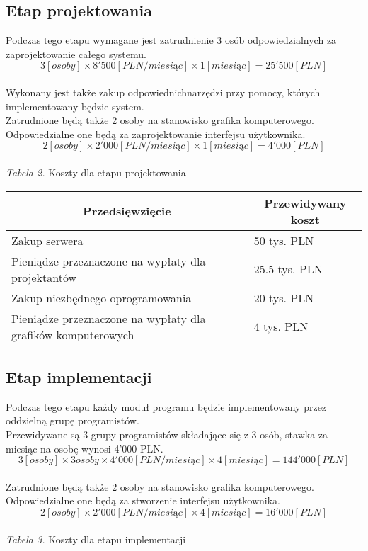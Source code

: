 \documentclass [11pt, a4paper, leqno]	{article}	%
\begin{document}
\subsection{Etap projektowania}
\noindent
Podczas tego etapu wymagane jest zatrudnienie 3 osób odpowiedzialnych za zaprojektowanie całego systemu. \\
\begin{equation}3 [osoby] \times  8'500 [PLN/miesiąc] \times 1 [miesiąc] = 25'500 [PLN] \end{equation} \\
Wykonany jest także zakup odpowiednichnarzędzi przy pomocy, których implementowany będzie system.  \\
Zatrudnione będą także 2 osoby na stanowisko grafika komputerowego. Odpowiedzialne one będą za zaprojektowanie interfejsu użytkownika. \\
\begin{equation}2 [osoby] \times 2'000 [PLN/miesiąc] \times 1 [miesiąc] = 4'000 [PLN] \end{equation} \\
\textit{Tabela 2.} Koszty dla etapu projektowania

\begin{center}
	\begin{tabular}{| l | l |}
		\hline
		\multicolumn{1}{|c|}{Przedsięwzięcie} & 
		\multicolumn{1}{|c|}{Przewidywany koszt} \\ \hline \hline
		Zakup serwera & 50 tys. PLN \\ \hline
		Pieniądze przeznaczone na wypłaty dla projektantów & 25.5 tys. PLN \\ \hline
		Zakup niezbędnego oprogramowania & 20 tys. PLN \\ \hline
		Pieniądze przeznaczone na wypłaty dla grafików komputerowych & 4 tys. PLN \\ \hline
	\end{tabular}
\end{center}

\subsection{Etap implementacji}
\noindent
Podczas tego etapu każdy moduł programu będzie implementowany przez oddzielną grupę programistów. \\
Przewidywane są 3 grupy programistów składające się z 3 osób, stawka za miesiąc na osobę wynosi 4’000 PLN. \\
\begin{equation}3 [osoby] \times 3 osoby \times 4'000 [PLN/miesiąc] \times  4 [miesiąc] = 144'000 [PLN] \end{equation} \\
Zatrudnione będą także 2 osoby na stanowisko grafika komputerowego. Odpowiedzialne one będą za stworzenie interfejsu użytkownika. \\
\begin{equation}2 [osoby] \times 2'000 [PLN/miesiąc] \times 4 [miesiąc] = 16'000 [PLN] \end{equation} \\
\textit{Tabela 3.} Koszty dla etapu implementacji
\end{document}
